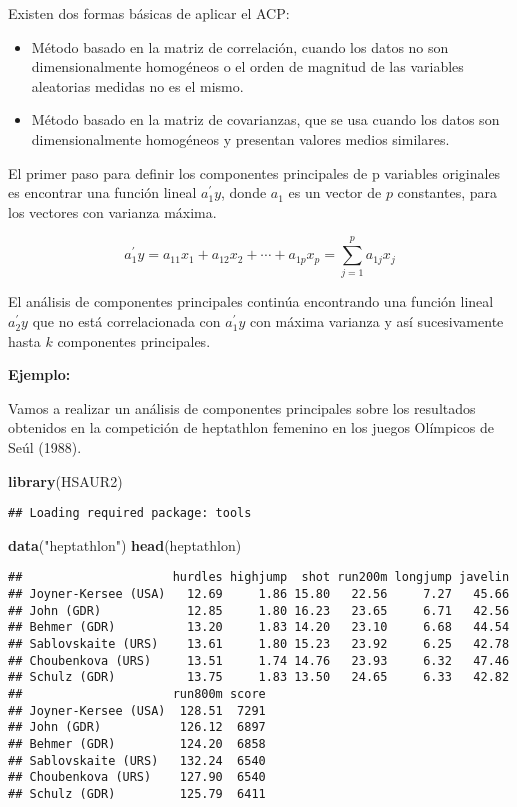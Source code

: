\documentclass[]{article}
\newenvironment{Shaded}{\begin{snugshade}}{\end{snugshade}}
\newcommand{\KeywordTok}[1]{\textcolor[rgb]{0.13,0.29,0.53}{\textbf{{#1}}}}
\newcommand{\StringTok}[1]{\textcolor[rgb]{0.31,0.60,0.02}{{#1}}}
\newcommand{\NormalTok}[1]{{#1}}
\numberwithin{equation}{section}
\begin{document}
Existen dos formas básicas de aplicar el ACP:

\begin{itemize}
\item
  Método basado en la matriz de correlación, cuando los datos no son
  dimensionalmente homogéneos o el orden de magnitud de las variables
  aleatorias medidas no es el mismo.
\item
  Método basado en la matriz de covarianzas, que se usa cuando los datos
  son dimensionalmente homogéneos y presentan valores medios similares.
\end{itemize}

El primer paso para definir los componentes principales de p variables
originales es encontrar una función lineal \(a_1^\prime y\), donde
\(a_1\) es un vector de \(p\) constantes, para los vectores con varianza
máxima.

\[
a_1^\prime y = a_{11}x_1 + a_{12}x_2 + \cdots + a_{1p}x_p = \sum_{j=1}^p a_{1j}x_j
\]

El análisis de componentes principales continúa encontrando una función
lineal \(a_2^\prime y\) que no está correlacionada con \(a_1^\prime y\)
con máxima varianza y así sucesivamente hasta \(k\) componentes
principales.

\textbf{Ejemplo:}

Vamos a realizar un análisis de componentes principales sobre los
resultados obtenidos en la competición de heptathlon femenino en los
juegos Olímpicos de Seúl (1988).

\begin{Shaded}
\begin{Highlighting}[]
\KeywordTok{library}\NormalTok{(HSAUR2)}
\end{Highlighting}
\end{Shaded}

\begin{verbatim}
## Loading required package: tools
\end{verbatim}

\begin{Shaded}
\begin{Highlighting}[]
\KeywordTok{data}\NormalTok{(}\StringTok{"heptathlon"}\NormalTok{)}
\KeywordTok{head}\NormalTok{(heptathlon)}
\end{Highlighting}
\end{Shaded}

\begin{verbatim}
##                     hurdles highjump  shot run200m longjump javelin
## Joyner-Kersee (USA)   12.69     1.86 15.80   22.56     7.27   45.66
## John (GDR)            12.85     1.80 16.23   23.65     6.71   42.56
## Behmer (GDR)          13.20     1.83 14.20   23.10     6.68   44.54
## Sablovskaite (URS)    13.61     1.80 15.23   23.92     6.25   42.78
## Choubenkova (URS)     13.51     1.74 14.76   23.93     6.32   47.46
## Schulz (GDR)          13.75     1.83 13.50   24.65     6.33   42.82
##                     run800m score
## Joyner-Kersee (USA)  128.51  7291
## John (GDR)           126.12  6897
## Behmer (GDR)         124.20  6858
## Sablovskaite (URS)   132.24  6540
## Choubenkova (URS)    127.90  6540
## Schulz (GDR)         125.79  6411
\end{verbatim}
\end{document}
